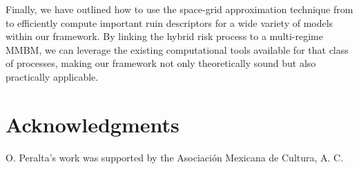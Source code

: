 \documentclass[11pt]{article}
\numberwithin{table}{section}
\numberwithin{figure}{section}
\numberwithin{equation}{section}
\newcommand{\1}{{\mathbf 1}}
\newcommand{\0}{\mat{0}}
\begin{document}
Finally, we have outlined how to use the space-grid approximation technique from \cite{albrecher2022space} to efficiently compute important ruin descriptors for a wide variety of models within our framework. By linking the hybrid risk process to a multi-regime MMBM, we can leverage the existing computational tools available for that class of processes, making our framework not only theoretically sound but also practically applicable.
\section*{Acknowledgments}
O. Peralta’s work was supported by the Asociación Mexicana de Cultura, A. C.




\end{document}
